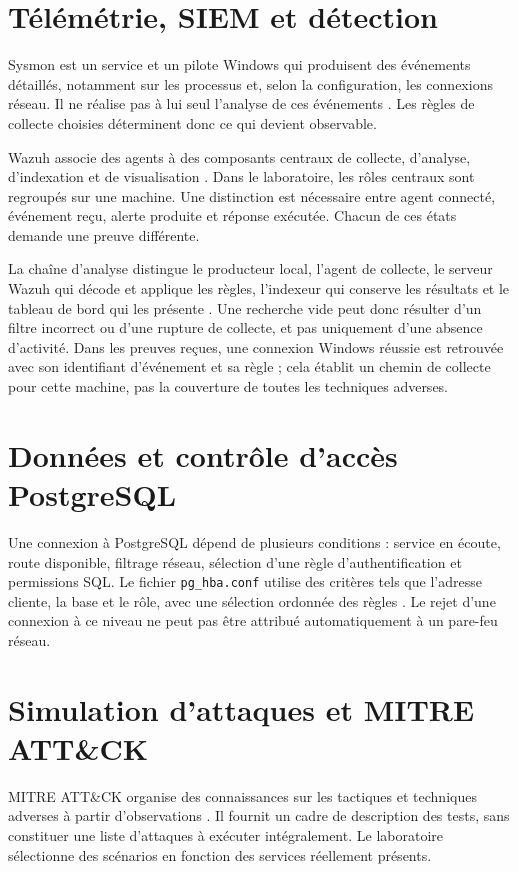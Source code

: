 \documentclass[a4paper,12pt]{report}
\begin{document}
\section{Télémétrie, SIEM et détection}
Sysmon est un service et un pilote Windows qui produisent des événements détaillés, notamment sur les processus et, selon la configuration, les connexions réseau. Il ne réalise pas à lui seul l'analyse de ces événements \cite{sysmon}. Les règles de collecte choisies déterminent donc ce qui devient observable.

Wazuh associe des agents à des composants centraux de collecte, d'analyse, d'indexation et de visualisation \cite{wazuh}. Dans le laboratoire, les rôles centraux sont regroupés sur une machine. Une distinction est nécessaire entre agent connecté, événement reçu, alerte produite et réponse exécutée. Chacun de ces états demande une preuve différente.

La chaîne d'analyse distingue le producteur local, l'agent de collecte, le serveur Wazuh qui décode et applique les règles, l'indexeur qui conserve les résultats et le tableau de bord qui les présente \cite{wazuh}. Une recherche vide peut donc résulter d'un filtre incorrect ou d'une rupture de collecte, et pas uniquement d'une absence d'activité. Dans les preuves reçues, une connexion Windows réussie est retrouvée avec son identifiant d'événement et sa règle ; cela établit un chemin de collecte pour cette machine, pas la couverture de toutes les techniques adverses.

\section{Données et contrôle d'accès PostgreSQL}
Une connexion à PostgreSQL dépend de plusieurs conditions : service en écoute, route disponible, filtrage réseau, sélection d'une règle d'authentification et permissions SQL. Le fichier \texttt{pg\_hba.conf} utilise des critères tels que l'adresse cliente, la base et le rôle, avec une sélection ordonnée des règles \cite{postgres}. Le rejet d'une connexion à ce niveau ne peut pas être attribué automatiquement à un pare-feu réseau.

\section{Simulation d'attaques et MITRE ATT\&CK}
MITRE ATT\&CK organise des connaissances sur les tactiques et techniques adverses à partir d'observations \cite{mitre}. Il fournit un cadre de description des tests, sans constituer une liste d'attaques à exécuter intégralement. Le laboratoire sélectionne des scénarios en fonction des services réellement présents.
\end{document}
